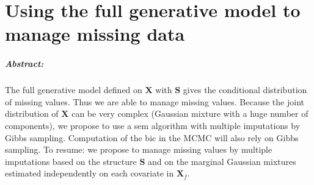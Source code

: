 \documentclass[12pt,a4paper]{report}
\begin{document}
\chapter{Using the full generative model to manage missing data} \label{chapmiss}
	\paragraph{Abstract:} The full generative model defined on $\boldsymbol{X}$ with $\boldsymbol{S}$ gives the conditional distribution of missing values. Thus we are able to manage missing values. Because the joint distribution of $\boldsymbol{X}$ can be very complex (Gaussian mixture with a huge number of components), we propose to use a {\sc sem} algorithm with multiple imputations by Gibbs sampling. Computation of the {\sc bic} in the MCMC will also rely on Gibbs sampling. To resume: we propose to manage missing values by multiple imputations based on the structure $\boldsymbol{S}$ and on the marginal Gaussian mixtures estimated independently on each covariate in $\boldsymbol{X}_f$.
	
	
\end{document}
